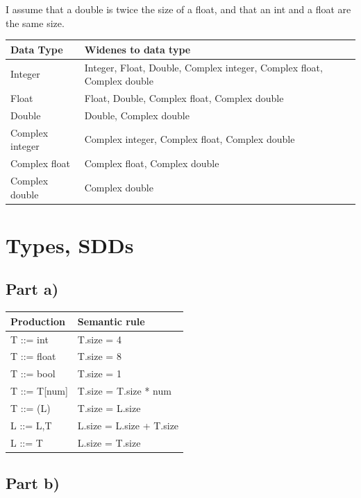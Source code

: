 \documentclass[paper=a4, fontsize=11pt]{scrartcl} %
\numberwithin{equation}{section} %
\numberwithin{figure}{section} %
\numberwithin{table}{section} %
\begin{document}
I assume that a double is twice the size of a float, and that an int and a float are the same size.

\begin{table}[ht!]
    \center
    \begin{tabular}{|l|l|}
    \hline
    Data Type   & Widenes to data type \\ \hline
    Integer & Integer, Float, Double, Complex integer, Complex float, Complex double \\
    Float & Float, Double, Complex float, Complex double \\
    Double & Double, Complex double \\
    Complex integer & Complex integer, Complex float, Complex double \\
    Complex float & Complex float, Complex double \\
    Complex double & Complex double \\ \hline
    \end{tabular}
\end{table}

\section{Types, SDDs}

\subsection{Part a)}

\begin{table}[ht!]
    \center
    \begin{tabular}{|l|l|}
    \hline
    Production   & Semantic rule   \\ \hline
    T ::= int    & T.size = 4 \\
    T ::= float  & T.size = 8 \\
    T ::= bool   & T.size = 1 \\
    T ::= T[num] & T.size = T.size * num \\
    T ::= (L)    & T.size = L.size \\
    L ::= L,T    & L.size = L.size + T.size \\
    L ::= T      & L.size = T.size \\ \hline
    \end{tabular}
\end{table}

\newpage
\subsection{Part b)}
\end{document}
